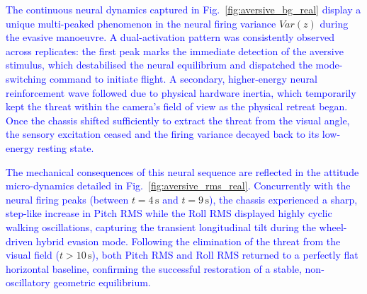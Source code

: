 \documentclass[preprint,12pt]{elsarticle}
\newcommand{\revblue}[1]{\textcolor{blue}{#1}}
\begin{document}
\revblue{The continuous neural dynamics captured in Fig.~}\ref{fig:aversive_bg_real} \revblue{display a unique multi-peaked phenomenon in the neural firing variance }$Var(z)$\revblue{ during the evasive manoeuvre. A dual-activation pattern was consistently observed across replicates: the first peak marks the immediate detection of the aversive stimulus, which destabilised the neural equilibrium and dispatched the mode-switching command to initiate flight. A secondary, higher-energy neural reinforcement wave followed due to physical hardware inertia, which temporarily kept the threat within the camera's field of view as the physical retreat began. Once the chassis shifted sufficiently to extract the threat from the visual angle, the sensory excitation ceased and the firing variance decayed back to its low-energy resting state.}

\revblue{The mechanical consequences of this neural sequence are reflected in the attitude micro-dynamics detailed in Fig.~}\ref{fig:aversive_rms_real}\revblue{. Concurrently with the neural firing peaks (between }$t = 4\,\text{s}$\revblue{ and }$t = 9\,\text{s}$\revblue{), the chassis experienced a sharp, step-like increase in Pitch RMS while the Roll RMS displayed highly cyclic walking oscillations, capturing the transient longitudinal tilt during the wheel-driven hybrid evasion mode. Following the elimination of the threat from the visual field (}$t > 10\,\text{s}$\revblue{), both Pitch RMS and Roll RMS returned to a perfectly flat horizontal baseline, confirming the successful restoration of a stable, non-oscillatory geometric equilibrium.}

\end{document}
